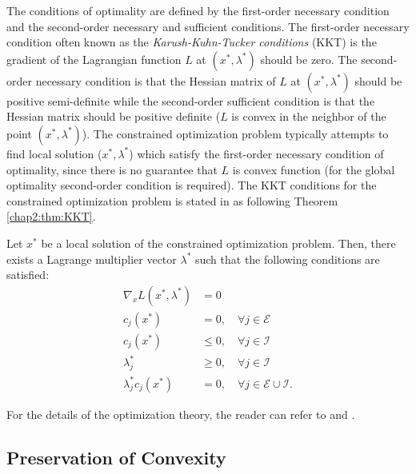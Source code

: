 The conditions of optimality are defined by the first-order necessary condition and the second-order necessary and sufficient conditions.
The first-order necessary condition often known as the \textit{Karush-Kuhn-Tucker conditions} (KKT) is the gradient of the Lagrangian function $L$ at $(x^*,\lambda^*)$ should be zero.
The second-order necessary condition is that the Hessian matrix of $L$ at $(x^*,\lambda^*)$ should be positive semi-definite while the second-order sufficient condition is that the Hessian matrix should be positive definite (\ie $L$ is convex in the neighbor of the point $(x^*,\lambda^*)$).
The constrained optimization problem typically attempts to find local solution ($x^*,\lambda^*$) which satisfy the first-order necessary condition of optimality, since there is no guarantee that $L$ is convex function (\ie for the global optimality second-order condition is required).
The KKT conditions for the constrained optimization problem is stated in \cite{RN9} as following Theorem \ref{chap2:thm:KKT}.

\begin{theorem}
  Let $x^*$ be a local solution of the constrained optimization problem. 
  Then, there exists a Lagrange multiplier vector $\lambda^*$ such that the following conditions are satisfied:
  \begin{equation}
    \begin{aligned}
      \nabla_x L(x^*,\lambda^*) &= 0\\
      c_j(x^*) &= 0, \quad \forall j\in\mathcal E\\
      c_j(x^*) &\leq 0, \quad \forall j\in\mathcal I\\
      \lambda_j^* &\geq 0, \quad \forall j\in\mathcal I\\
      \lambda_j^*c_j(x^*) &= 0, \quad \forall j\in\mathcal E\cup\mathcal I
      .
    \end{aligned}
  \end{equation}
  \label{chap2:thm:KKT}
\end{theorem}
For the details of the optimization theory, the reader can refer to \cite{RN9} and \cite{RN1}.

\subsection{Preservation of Convexity} 

